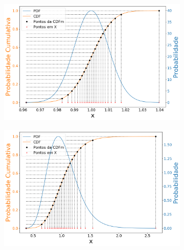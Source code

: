 \begin{figure}[H]
	\centering
	\begin{subfigure}[b]{0.49\textwidth}
		\centering 
		\includegraphics[width=\textwidth]{./figuras/CDFm_lognormal_001.png}
		\caption{}
		\label{fig:log001}
	\end{subfigure}
	\hfill
	\begin{subfigure}[b]{0.49\textwidth}
		\centering 
		\includegraphics[width=\textwidth]{./figuras/CDFm_lognormal_025}
		\caption{}
		\label{fig:log025}
	\end{subfigure}
	

\end{figure}
